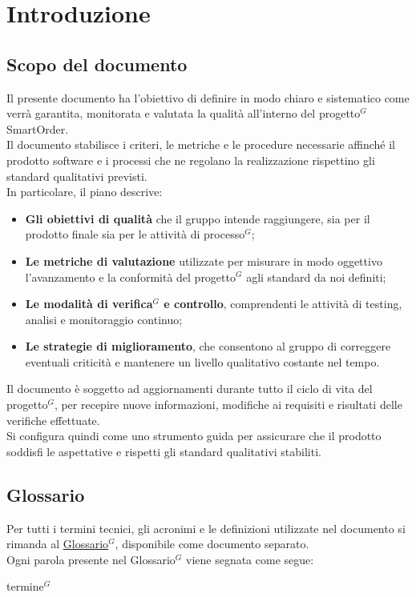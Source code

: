 \section{Introduzione}
	\subsection{Scopo del documento}
	Il presente documento ha l’obiettivo di definire in modo chiaro e sistematico come verrà garantita, monitorata e valutata la qualità all’interno del progetto$^G$ SmartOrder.\\
	Il documento stabilisce i criteri, le metriche e le procedure necessarie affinché il prodotto software e i processi che ne regolano la realizzazione rispettino gli standard qualitativi previsti.\\
	In particolare, il piano descrive:
	\begin{itemize}[itemsep=0pt, parsep=1pt, label=$\scriptstyle\bullet$]
        \item \textbf{Gli obiettivi di qualità} che il gruppo intende raggiungere, sia per il prodotto finale sia per le attività di processo$^G$;
        \item \textbf{Le metriche di valutazione} utilizzate per misurare in modo oggettivo l’avanzamento e la conformità del progetto$^G$ agli standard da noi definiti;
        \item \textbf{Le modalità di verifica$^G$ e controllo}, comprendenti le attività di testing, analisi e monitoraggio continuo;
        \item \textbf{Le strategie di miglioramento}, che consentono al gruppo di correggere eventuali criticità e mantenere un livello qualitativo costante nel tempo.
    \end{itemize}
	Il documento è soggetto ad aggiornamenti durante tutto il ciclo di vita del progetto$^G$, per recepire nuove informazioni, modifiche ai requisiti e risultati delle verifiche effettuate.\\
	Si configura quindi come uno strumento guida per assicurare che il prodotto soddisfi le aspettative e rispetti gli standard qualitativi stabiliti.

	\subsection{Glossario}
	Per tutti i termini tecnici, gli acronimi e le definizioni utilizzate nel documento si rimanda al \underline{\href{https://nullpointersgroup.github.io/Documentazione/output/PB/Documenti\%20Interni/Glossario.pdf}{Glossario$^G$}}, disponibile come documento separato.\\
	Ogni parola presente nel Glossario$^G$ viene segnata come segue:
	\begin{center}
		termine$^{G}$
	\end{center}

